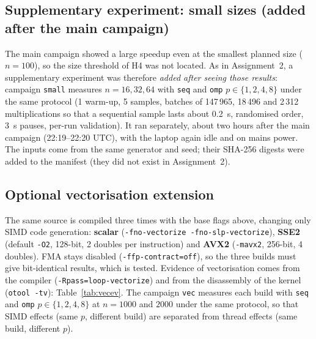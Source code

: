 \subsection{Supplementary experiment: small sizes (added after the main campaign)}
The main campaign showed a large speedup even at the smallest planned size ($n=100$), so the size threshold of H4 was not located. As in
Assignment~2, a supplementary experiment was therefore \emph{added after seeing those results}: campaign \texttt{small} measures $n=16,32,64$ with
\texttt{seq} and \texttt{omp} $p\in\{1,2,4,8\}$ under the same protocol (1 warm-up, 5 samples, batches of 147\,965, 18\,496 and 2\,312
multiplications so that a sequential sample lasts about 0.2~s, randomised order, 3~s pauses, per-run validation). It ran separately, about two hours
after the main campaign (22:19--22:20 UTC), with the laptop again idle and on mains power. The inputs come from the same generator and seed; their SHA-256 digests were
added to the manifest (they did not exist in Assignment~2).

\subsection{Optional vectorisation extension}
The same source is compiled three times with the base flags above, changing only SIMD code generation: \textbf{scalar}
(\texttt{-fno-vectorize -fno-slp-vectorize}), \textbf{SSE2} (default \texttt{-O2}, 128-bit, 2 doubles per instruction) and \textbf{AVX2}
(\texttt{-mavx2}, 256-bit, 4 doubles). FMA stays disabled (\texttt{-ffp-contract=off}), so the three builds must give bit-identical
results, which is tested. Evidence of vectorisation comes from the compiler (\texttt{-Rpass=loop-vectorize}) and from the disassembly of
the kernel (\texttt{otool -tv}): Table~\ref{tab:vecev}. The campaign \texttt{vec} measures each build with \texttt{seq} and \texttt{omp}
$p\in\{1,2,4,8\}$ at $n=1000$ and $2000$ under the same protocol, so that SIMD effects (same $p$, different build) are separated from
thread effects (same build, different $p$).
